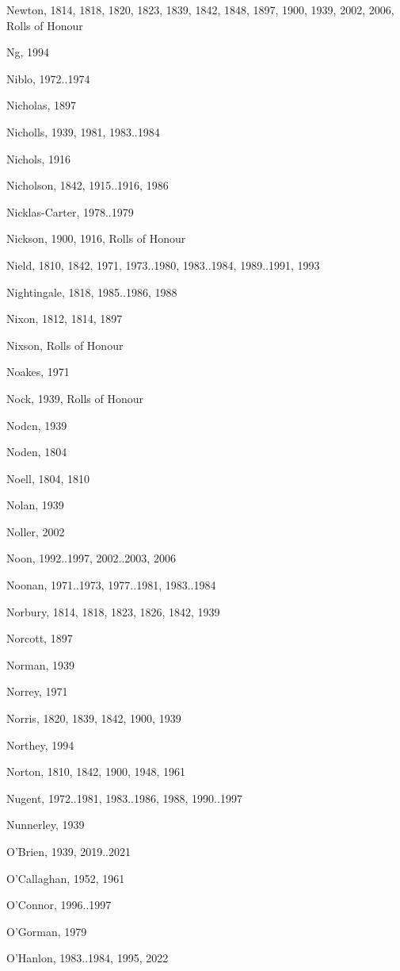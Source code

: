 {\begin{theindex}
\item Newton, 1814, 1818, 1820, 1823, 1839, 1842, 1848, 1897, 1900, 1939, 2002, 2006, Rolls of Honour
\item Ng, 1994
\item Niblo, 1972..1974
\item Nicholas, 1897
\item Nicholls, 1939, 1981, 1983..1984
\item Nichols, 1916
\item Nicholson, 1842, 1915..1916, 1986
\item Nicklas-Carter, 1978..1979
\item Nickson, 1900, 1916, Rolls of Honour
\item Nield, 1810, 1842, 1971, 1973..1980, 1983..1984, 1989..1991, 1993
\item Nightingale, 1818, 1985..1986, 1988
\item Nixon, 1812, 1814, 1897
\item Nixson, Rolls of Honour
\item Noakes, 1971
\item Nock, 1939, Rolls of Honour
\item Nodcn, 1939
\item Noden, 1804
\item Noell, 1804, 1810
\item Nolan, 1939
\item Noller, 2002
\item Noon, 1992..1997, 2002..2003, 2006
\item Noonan, 1971..1973, 1977..1981, 1983..1984
\item Norbury, 1814, 1818, 1823, 1826, 1842, 1939
\item Norcott, 1897
\item Norman, 1939
\item Norrey, 1971
\item Norris, 1820, 1839, 1842, 1900, 1939
\item Northey, 1994
\item Norton, 1810, 1842, 1900, 1948, 1961
\item Nugent, 1972..1981, 1983..1986, 1988, 1990..1997
\item Nunnerley, 1939
\item O'Brien, 1939, 2019..2021
\item O'Callaghan, 1952, 1961
\item O'Connor, 1996..1997
\item O'Gorman, 1979
\item O'Hanlon, 1983..1984, 1995, 2022

\end{theindex}}
